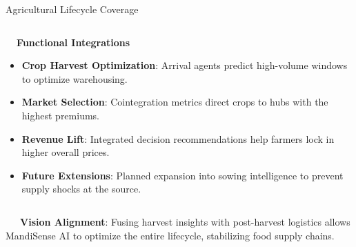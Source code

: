 \documentclass{beamer}
\begin{document}
\begin{frame}{Agricultural Lifecycle Coverage}
\begin{columns}[T]
    \begin{column}{0.48\textwidth}
        \begin{smallcard}[0.98\textwidth, top=3pt, bottom=3pt, left=4pt, right=4pt, boxsep=0.5pt]
            \centering \textbf{\textcolor{primaryDark}{\small {}~~Functional Integrations}}
            \vspace{0.08cm}
            \fontsize{6.8pt}{8.2pt}\selectfont
            \begin{itemize}\setlength\itemsep{3pt}\setlength\parskip{0pt}
                \item \textbf{Crop Harvest Optimization}: Arrival agents predict high-volume windows to optimize warehousing.
                \item \textbf{Market Selection}: Cointegration metrics direct crops to hubs with the highest premiums.
                \item \textbf{Revenue Lift}: Integrated decision recommendations help farmers lock in higher overall prices.
                \item \textbf{Future Extensions}: Planned expansion into sowing intelligence to prevent supply shocks at the source.
            \end{itemize}
        \end{smallcard}
    \end{column}
\end{columns}

\vspace{0.15cm}
\begin{tcolorbox}[enhanced, colback=primaryblue!4, colframe=primaryblue!30, boxrule=0.35pt,
  arc=3.5pt, width=0.98\textwidth, left=4pt, right=4pt, top=2.5pt, bottom=2.5pt, boxsep=0pt,
  halign=center, shadow={0.5pt}{-0.5pt}{0pt}{black!8}]
    \fontsize{5.5pt}{6.5pt}\selectfont
    \textcolor{primaryDark}{~~~\textbf{Vision Alignment}: Fusing harvest insights with post-harvest logistics allows MandiSense AI to optimize the entire lifecycle, stabilizing food supply chains.}
\end{tcolorbox}
\end{frame}
\end{document}
